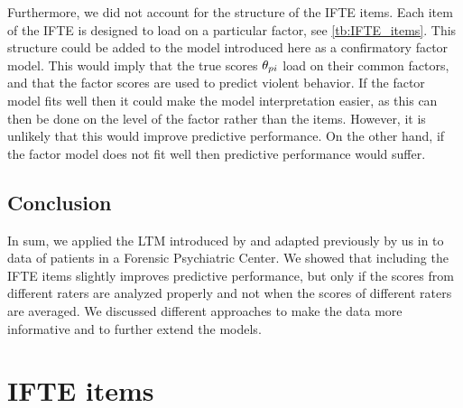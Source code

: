\documentclass[a4paper,11pt]{article}
\begin{document}
Furthermore, we did not account for the structure of the IFTE items.
Each item of the IFTE is designed to load on a particular factor, see \autoref{tb:IFTE_items}.
This structure could be added to the model introduced here as a confirmatory factor model.
This would imply that the true scores $\theta_{pi}$ load on their common factors, and that the factor scores are used to predict violent behavior.
If the factor model fits well then it could make the model interpretation easier, as this can then be done on the level of the factor rather than the items.
However, it is unlikely that this would improve predictive performance.
On the other hand, if the factor model does not fit well then predictive performance would suffer.

\subsection{Conclusion}
In sum, we applied the LTM introduced by \textcite{Anders2015cultural} and adapted previously by us in \textcite{vandenBergh2020cultural} to data of patients in a Forensic Psychiatric Center.
We showed that including the IFTE items slightly improves predictive performance, but only if the scores from different raters are analyzed properly and not when the scores of different raters are averaged.
We discussed different approaches to make the data more informative and to further extend the models.

\printbibliography
\newpage

\appendix

\section{IFTE items}
\end{document}
